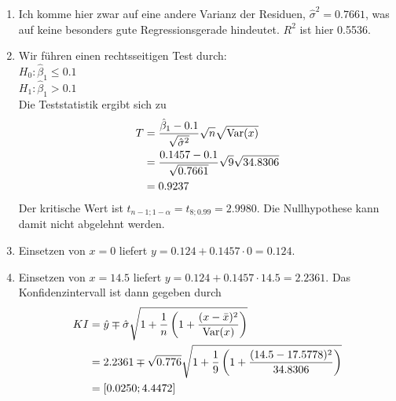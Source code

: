 \documentclass{article}
\DeclareMathOperator{\Var}{Var}
\begin{document}
\begin{enumerate}[label=(\alph*)]
\begin{center}
		\end{center}
		\item Ich komme hier zwar auf eine andere Varianz der Residuen, $\hat{\sigma}^2=0.7661$, was auf keine besonders gute Regressionsgerade hindeutet. $R^2$ ist hier 0.5536.
		\item Wir führen einen rechtsseitigen Test durch: \\
		$H_0: \hat{\beta}_1 \le 0.1$ \\
		$H_1: \hat{\beta}_1 > 0.1$ \\
		Die Teststatistik ergibt sich zu
		\begin{align}
			T &= \frac{\hat{\beta}_1 - 0.1}{\sqrt{\hat{\sigma}^2}}\sqrt{n}\sqrt{\Var(x)} \notag \\
			&= \frac{0.1457-0.1}{\sqrt{0.7661}}\sqrt{9}\sqrt{34.8306} \notag \\
			&= 0.9237 \notag
		\end{align}
		Der kritische Wert ist $t_{n-1;1-\alpha}=t_{8;0.99}=2.9980$. Die Nullhypothese kann damit nicht abgelehnt werden.
		\item Einsetzen von $x=0$ liefert $y=0.124 + 0.1457\cdot 0 = 0.124$.
		\item Einsetzen von $x=14.5$ liefert $y=0.124 + 0.1457\cdot 14.5=2.2361$. Das Konfidenzintervall ist dann gegeben durch
		\begin{align}
			KI &= \hat{y} \mp \hat{\sigma}\sqrt{1+\frac{1}{n}\left(1+\frac{(x-\bar{x})^2}{\Var(x)}\right)} \notag \\
			&= 2.2361 \mp \sqrt{0.776}\sqrt{1+\frac{1}{9}\left(1+\frac{(14.5-17.5778)^2}{34.8306}\right)} \notag \\
			&= [0.0250;4.4472] \notag
		\end{align}
	\end{enumerate}
	
\end{document}
